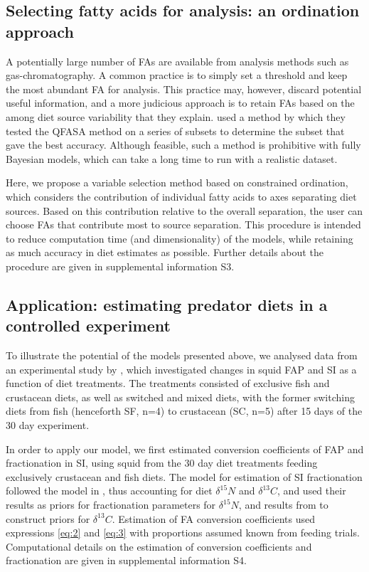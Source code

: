 \documentclass[fleqn,10pt]{wlpeerj}
\begin{document}
\subsection*{Selecting fatty acids for analysis: an ordination approach}

A potentially large number of FAs are available from analysis methods
such as gas-chromatography. A common practice is to simply set a
threshold and keep the most abundant FA for analysis. This practice
may, however, discard potential useful information, and a more
judicious approach is to retain FAs based on the among diet source
variability that they explain. \citet{wang_validating_2010} used a
method by which they tested the QFASA method on a series of subsets to
determine the subset that gave the best accuracy. Although feasible, such
a method is prohibitive with fully Bayesian models, which can take a long
time to run with a realistic dataset.

Here, we propose a variable selection method based on constrained
ordination, which considers the contribution of individual fatty
acids to axes separating diet sources. Based on this contribution
relative to the overall separation, the user can choose FAs
that contribute most to source separation. This procedure is intended
to reduce computation time (and dimensionality) of the models,
while retaining as much accuracy in diet estimates as possible. Further details about the
procedure are given in supplemental information S3.


\subsection*{Application: estimating predator diets in a controlled
  experiment}

To illustrate the potential of the models presented above, we analysed
data from an experimental study by
\citet{stowasser_experimental_2006}, which investigated changes in
squid FAP and SI as a function of diet treatments. The treatments consisted of
exclusive fish and crustacean diets, as well as switched and mixed
diets, with the former switching diets from fish (henceforth SF, n=4) to
crustacean (SC, n=5) after 15 days of the 30 day experiment. 

In order to apply our model, we first estimated conversion
coefficients of FAP and fractionation in SI, using squid from the 30
day diet treatments feeding exclusively crustacean and fish diets. The
model for estimation of SI fractionation followed the model in
\citet{hussey_rescaling_2014}, thus accounting for diet $\delta^{15}N$
and $\delta^{13}C$, and used their results as priors for fractionation
parameters for $\delta^{15}N$, and results from \citet{caut_variation_2009} to
construct priors for $\delta^{13}C$. Estimation of FA conversion coefficients used expressions \eqref{eq:2} and \eqref{eq:3} with proportions assumed known from feeding
 trials. Computational details on the estimation of conversion coefficients and
 fractionation are given in supplemental information S4.
\end{document}

